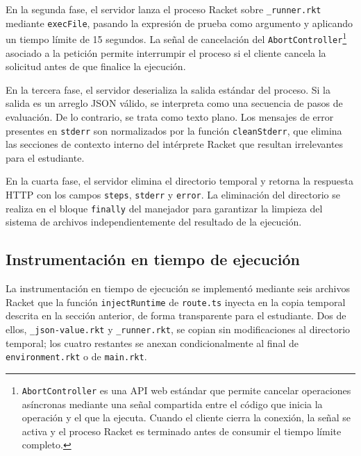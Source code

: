 En la segunda fase, el servidor lanza el proceso Racket sobre \texttt{\_runner.rkt} mediante \texttt{execFile}, pasando la expresión de prueba como argumento y aplicando un tiempo límite de 15 segundos. La señal de cancelación del \texttt{Abort\allowbreak Controller}\footnote{\texttt{Abort\allowbreak Controller} es una API web estándar que permite cancelar operaciones asíncronas mediante una señal compartida entre el código que inicia la operación y el que la ejecuta. Cuando el cliente cierra la conexión, la señal se activa y el proceso Racket es terminado antes de consumir el tiempo límite completo.} asociado a la petición permite interrumpir el proceso si el cliente cancela la solicitud antes de que finalice la ejecución.

En la tercera fase, el servidor deserializa la salida estándar del proceso. Si la salida es un arreglo JSON válido, se interpreta como una secuencia de pasos de evaluación. De lo contrario, se trata como texto plano. Los mensajes de error presentes en \texttt{stderr} son normalizados por la función \texttt{clean\allowbreak Stderr}, que elimina las secciones de contexto interno del intérprete Racket que resultan irrelevantes para el estudiante.

En la cuarta fase, el servidor elimina el directorio temporal y retorna la respuesta HTTP con los campos \texttt{steps}, \texttt{stderr} y \texttt{error}. La eliminación del directorio se realiza en el bloque \texttt{finally} del manejador para garantizar la limpieza del sistema de archivos independientemente del resultado de la ejecución.

\subsection{Instrumentación en tiempo de ejecución}

La instrumentación en tiempo de ejecución se implementó mediante seis archivos Racket que la función \texttt{inject\allowbreak Runtime} de \texttt{route.ts} inyecta en la copia temporal descrita en la sección anterior, de forma transparente para el estudiante. Dos de ellos, \texttt{\_json-value.rkt} y \texttt{\_runner.rkt}, se copian sin modificaciones al directorio temporal; los cuatro restantes se anexan condicionalmente al final de \texttt{environment.rkt} o de \texttt{main.rkt}.

